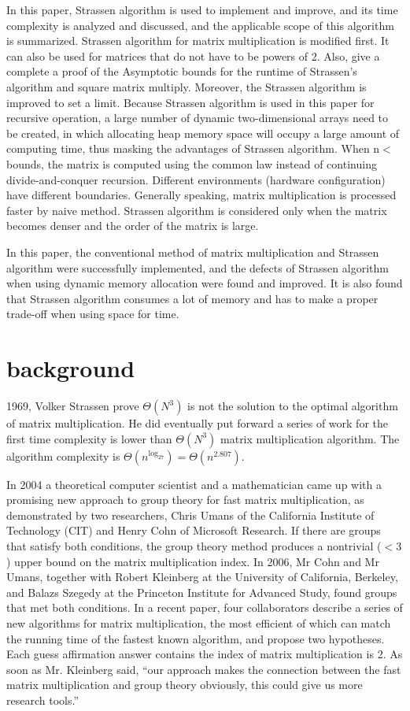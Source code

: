 \documentclass[journal]{IEEEtran}
\begin{document}
In this paper, Strassen algorithm is used to implement and improve, and its time complexity is analyzed and discussed, and the applicable scope of this algorithm is summarized.
Strassen algorithm for matrix multiplication is modified first.
It can also be used for matrices that do not have to be powers of 2.
Also, give a complete a proof of the Asymptotic bounds for the runtime of Strassen’s algorithm and square matrix multiply.
Moreover, the Strassen algorithm is improved to set a limit.
Because Strassen algorithm is used in this paper for recursive operation, a large number of dynamic two-dimensional arrays need to be created, in which allocating heap memory space will occupy a large amount of computing time, thus masking the advantages of Strassen algorithm.
When n$<$bounds, the matrix is computed using the common law instead of continuing divide-and-conquer recursion.
Different environments (hardware configuration) have different boundaries.
Generally speaking, matrix multiplication is processed faster by naive method.
Strassen algorithm is considered only when the matrix becomes denser and the order of the matrix is large.


In this paper, the conventional method of matrix multiplication and Strassen algorithm were successfully implemented, and the defects of Strassen algorithm when using dynamic memory allocation were found and improved.
It is also found that Strassen algorithm consumes a lot of memory and has to make a proper trade-off when using space for time.
\section{background}
1969, Volker Strassen prove $\Theta(N^3)$ is not the solution to the optimal algorithm of matrix multiplication.
He did eventually put forward a series of work for the first time complexity is lower than $\Theta(N^3)$ matrix multiplication algorithm.
The algorithm complexity is $\Theta(n^{\mathrm{log}_27})=\Theta(n^{2.807})$.


In 2004 a theoretical computer scientist and a mathematician came up with a promising new approach to group theory for fast matrix multiplication, as demonstrated by two researchers, Chris Umans of the California Institute of Technology (CIT) and Henry Cohn of Microsoft Research.
If there are groups that satisfy both conditions, the group theory method produces a nontrivial ($<3$) upper bound on the matrix multiplication index.
In 2006, Mr Cohn and Mr Umans, together with Robert Kleinberg at the University of California, Berkeley, and Balazs Szegedy at the Princeton Institute for Advanced Study, found groups that met both conditions.
In a recent paper, four collaborators describe a series of new algorithms for matrix multiplication, the most efficient of which can match the running time of the fastest known algorithm, and propose two hypotheses.
Each guess affirmation answer contains the index of matrix multiplication is 2.
As soon as Mr. Kleinberg said, “our approach makes the connection between the fast matrix multiplication and group theory obviously, this could give us more research tools.”
\end{document}
